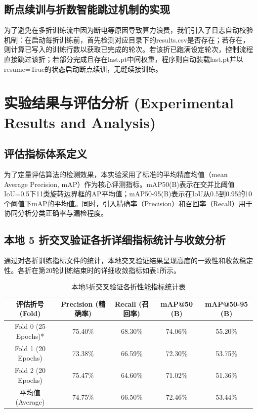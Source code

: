 \documentclass[utf8,a4paper,zihao=-4]{ctexart}
\begin{document}
\subsection{断点续训与折数智能跳过机制的实现}
为了避免在多折训练流中因为断电等原因导致算力浪费，我们引入了日志自动校验机制：在启动每折训练前，首先检测对应目录下的results.csv是否存在；若存在，则计算已写入的训练行数以获取已完成的轮次。若该折已跑满设定轮次，控制流程直接跳过该折；若部分完成且存在last.pt中间权重，程序则自动装载last.pt并以resume=True的状态启动断点续训，无缝续接训练。

\section{实验结果与评估分析 (Experimental Results and Analysis)}

\subsection{评估指标体系定义}
为了定量评估算法的检测效果，本实验采用了标准的平均精度均值（mean Average Precision, mAP）作为核心评测指标。mAP50(B)表示在交并比阈值IoU=0.5下11类旋转边界框的AP平均值；mAP50-95(B)表示在IoU从0.5到0.95的10个阈值下mAP的平均值。同时，引入精确率（Precision）和召回率（Recall）用于协同分析分类正确率与漏检程度。

\subsection{本地 5 折交叉验证各折详细指标统计与收敛分析}
通过对各折训练指标文件的统计，本地交叉验证结果呈现高度的一致性和收敛稳定性。各折在第20轮训练结束时的详细收敛指标如表1所示。

\begin{table}[H]
\centering
\caption{本地5折交叉验证各折性能指标统计表}
\label{tab:metrics}
\begin{tabular}{ccccc}
\toprule
\textbf{评估折号 (Fold)} & \textbf{Precision (精确率)} & \textbf{Recall (召回率)} & \textbf{mAP@50 (B)} & \textbf{mAP@50-95 (B)} \\
\midrule
Fold 0 (25 Epochs)* & 75.40\% & 68.30\% & 74.06\% & 55.20\% \\
Fold 1 (20 Epochs)  & 73.38\% & 66.59\% & 72.30\% & 53.75\% \\
Fold 2 (20 Epochs)  & 75.47\% & 64.60\% & 71.02\% & 51.36\% \\
\midrule
平均值 (Average)     & 74.75\% & 66.50\% & 72.46\% & 53.44\% \\
\bottomrule
\end{tabular}
\end{table}
\end{document}
